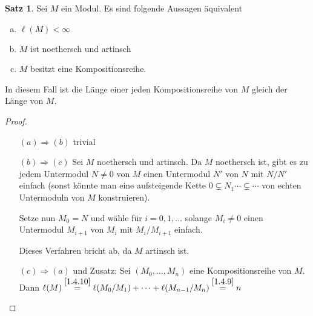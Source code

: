 \documentclass[
twoside=semi,
fontsize=12,
DIV=12, 
cleardoublepage=current,
leqno,
headings=optiontoheadandtoc, 
toc=idx
]{scrbook}
\theoremstyle{definition}
\newtheorem{satz}[definition]{Satz}
\begin{document}
	\begin{satz}\label{1.4.13}
		Sei $M$ ein Modul. Es sind folgende Aussagen \"aquivalent
		
		\begin{enumerate}[(a)]
			\item $\ell(M) < \infty$
			\item $M$ ist noethersch und artinsch
			\item $M$ besitzt eine Kompositionsreihe.
		\end{enumerate}
		
		In diesem Fall ist die L\"ange einer jeden Kompositionsreihe von $M$ gleich der L\"ange von $M$.
		
		\begin{proof}\hfill
			\begin{enumerate}
				\item[$(a)\Rightarrow(b)$] trivial
				\item[$(b)\Rightarrow(c)$]
				Sei $M$ noethersch und artinsch. Da $M$ noethersch ist, gibt es zu jedem Untermodul $N \neq 0$ von $M$ einen Untermodul $N'$ von $N$ mit $N/N'$ einfach (sonst k\"onnte man eine aufsteigende Kette $0 \subsetneq N_1 \cdots \subsetneq  \cdots$ von echten Untermoduln von $M$ konstruieren).
				
				\noindent Setze nun $M_0 = N$ und w\"ahle f\"ur $i = 0, 1, \dots$ solange $M_i \neq 0$ einen Untermodul $M_{i+1}$ von $M_i$ mit $M_i/M_{i+1}$ einfach.
				
				\noindent Dieses Verfahren bricht ab, da $M$ artinsch ist.
				
				\item[$(c)\Rightarrow(a)$] und Zusatz: 
				Sei $(M_0, \dots, M_n)$ eine Kompositionsreihe von $M$. Dann $\ell(M) \overset{\ref{1.4.10}}{=} \ell(M_0/M_1) + \cdots + \ell(M_{n-1}/M_n) \overset{\ref{1.4.9}}{=} n$
			\end{enumerate}
		\end{proof}
	\end{satz}
\end{document}
